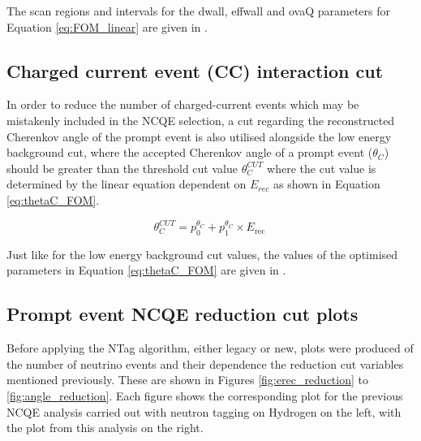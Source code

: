 The scan regions and intervals for the dwall, effwall and ovaQ parameters for Equation \ref{eq:FOM_linear} are given in \cite{Abe_2019}. 

\subsection{Charged current event (CC) interaction cut}

In order to reduce the number of charged-current events which may be mistakenly included in the NCQE selection, a cut regarding the reconstructed Cherenkov angle of the prompt event  is also utilised alongside the low energy background cut, where the accepted Cherenkov angle of a prompt event ($\theta_{C}$) should be greater than the threshold cut value $\theta_{C}^{CUT}$ where the cut value is determined by the linear equation dependent on $E_{rec}$ as shown in Equation \ref{eq:thetaC_FOM}.

\begin{equation}
    \theta_{C}^{C U T}=p_{0}^{\theta_{C}}+p_{1}^{\theta_{C}} \times E_{\text {rec }}
    \label{eq:thetaC_FOM} 
\end{equation}

Just like for the low energy background cut values, the values of the optimised parameters in Equation \ref{eq:thetaC_FOM} are given in \cite{Abe_2019}.


\subsection{Prompt event NCQE reduction cut plots}

Before applying the NTag algorithm, either legacy or new, plots were produced of the number of neutrino events and their dependence the reduction cut variables mentioned previously. These are shown in Figures \ref{fig:erec_reduction} to \ref{fig:angle_reduction}. Each figure shows the corresponding plot for the previous NCQE analysis carried out with neutron tagging on Hydrogen on the left, with the plot from this analysis on the right. 


